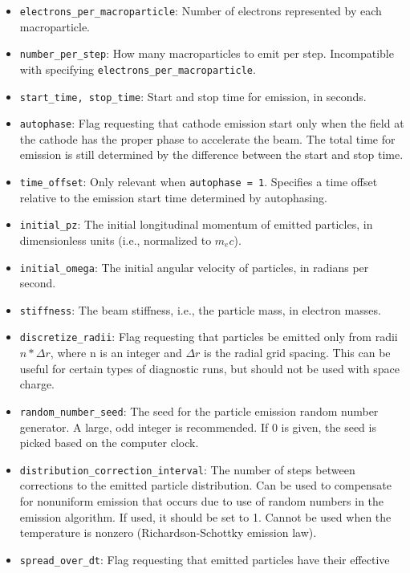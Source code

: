 \begin{itemize}
\begin{itemize}
    \item {\tt electrons\_per\_macroparticle}: Number of electrons represented by
        each macroparticle.  
    \item {\tt number\_per\_step}: How many macroparticles to emit per
        step.  Incompatible with specifying {\tt electrons\_per\_macroparticle}.
    \item {\tt start\_time, stop\_time}: Start and stop time for emission, in seconds.
    \item {\tt autophase}: Flag requesting that cathode emission start only when the
        field at the cathode has the proper phase to accelerate the beam.  The total
        time for emission is still determined by the difference between the start
        and stop time.
    \item {\tt time\_offset}: Only relevant when {\tt autophase = 1}.  Specifies a time
        offset relative to the emission start time determined by autophasing.
    \item {\tt initial\_pz}:  The initial longitudinal momentum of emitted
        particles, in dimensionless units (i.e., normalized to $m_e c$).
    \item {\tt initial\_omega}: The initial angular velocity of particles, in
        radians per second.
    \item {\tt stiffness}: The beam stiffness, i.e., the particle mass,
        in electron masses.
    \item {\tt discretize\_radii}: Flag requesting that particles be emitted only from
        radii $n*\Delta r$, where n is an integer and $\Delta r$ is the radial grid spacing.
        This can be useful for certain types of diagnostic runs, but should not be used with    
        space charge.
    \item {\tt random\_number\_seed}:  The seed for the particle emission random number
        generator.  A large, odd integer is recommended.  If 0 is given, the seed is picked based
        on the computer clock.
    \item {\tt distribution\_correction\_interval}: The number of steps between corrections to
        the emitted particle distribution.  Can be used to compensate for nonuniform emission
        that occurs due to use of random numbers in the emission algorithm.  If used, it should
        be set to 1.  Cannot be used when the temperature is nonzero (Richardson-Schottky
        emission law).
    \item {\tt spread\_over\_dt}: Flag requesting that emitted particles have their effective 

\end{itemize}
\end{itemize}
